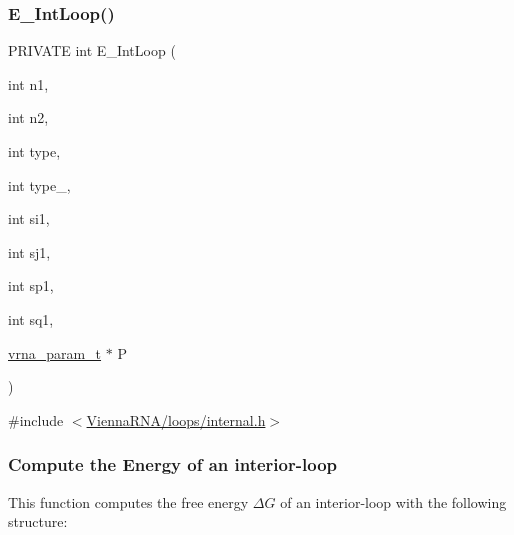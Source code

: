 \subsubsection{\texorpdfstring{E\_IntLoop()}{E\_IntLoop()}}
{\footnotesize\ttfamily P\+R\+I\+V\+A\+TE int E\+\_\+\+Int\+Loop (\begin{DoxyParamCaption}\item[{int}]{n1,  }\item[{int}]{n2,  }\item[{int}]{type,  }\item[{int}]{type\+\_,  }\item[{int}]{si1,  }\item[{int}]{sj1,  }\item[{int}]{sp1,  }\item[{int}]{sq1,  }\item[{\mbox{\hyperlink{group__energy__parameters_ga8a69ca7d787e4fd6079914f5343a1f35}{vrna\+\_\+param\+\_\+t}} $\ast$}]{P }\end{DoxyParamCaption})}



{\ttfamily \#include $<$\mbox{\hyperlink{internal_8h}{Vienna\+R\+N\+A/loops/internal.\+h}}$>$}

\subsubsection*{Compute the Energy of an interior-\/loop}

This function computes the free energy $\Delta G$ of an interior-\/loop with the following structure\+: ~\newline
 
